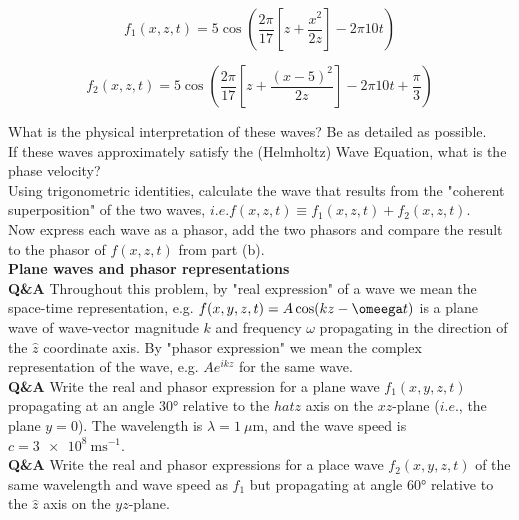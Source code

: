 \documentclass[main.tex]{subfiles}
\begin{document}
\begin{equation}\label{eq:ws_1}
f_1(x,z,t) = 5\cos \left(\frac{2 \pi}{17} \left[ z+\frac{x^2}{2z} \right] -2\pi 10t \right)
\end{equation}

\begin{equation}\label{eq:ws_2}
f_2(x,z,t) = 5\cos \left(\frac{2 \pi}{17} \left[ z+\frac{(x-5)^2}{2z} \right] -2\pi 10t + \frac{\pi}{3} \right)
\end{equation}

What is the physical interpretation of these waves? Be as detailed as possible.\\

If these waves approximately satisfy the (Helmholtz) Wave Equation, what is the phase velocity?\\

Using trigonometric identities, calculate the wave that results from the "coherent superposition" of the two waves, $i.e. f(x,z,t) \equiv f_1(x,z,t) + f_2(x,z,t)$.\\

Now express each wave as a phasor, add the two phasors and compare the result to the phasor of $f(x,z,t)$ from part (b).\\

\textbf{Plane waves and phasor representations}\\
\textbf{Q\&A} Throughout this problem, by "real expression" of a wave we mean the space-time representation, e.g. $f(x,y,z,t) = A\cos(kz-\omeega t)$ is a plane wave of wave-vector magnitude $k$ and frequency $\omega$ propagating in the direction of the $\hat{z}$ coordinate axis. By "phasor expression" we mean the complex representation of the wave, e.g. $Ae^{ikz}$ for the same wave.\\

\textbf{Q\&A} Write the real and phasor expression for a plane wave $f_1(x,y,z,t)$ propagating at an angle $\ang{30}$ relative to the $hat{z}$ axis on the $xz$-plane ($i.e.$, the plane $y=0$). The wavelength is $\lambda = \SI{1}{\mu \meter}$, and the wave speed is $c = \SI{3e8}{\metre \second^{-1}}$.\\

\textbf{Q\&A} Write the real and phasor expressions for a place wave $f_2(x,y,z,t)$ of the same wavelength and wave speed as $f_1$ but propagating at angle $\ang{60}$ relative to the $\hat{z}$ axis on the $yz$-plane.
\end{document}
